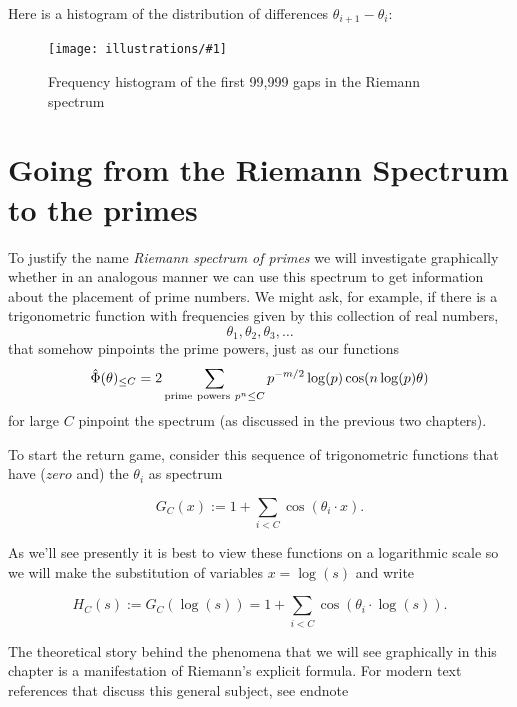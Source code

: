 \documentclass[openany]{book}
\newcommand{\ill}[3]{%
   \begin{figure}[H]%
   \vspace{-2ex}
   \centering%
   \texttt{[image: illustrations/\#1]}%
   \caption{#3}%
   \vspace{-2ex}
    \end{figure}}
\theoremstyle{plain}
\theoremstyle{definition}
\begin{document}
{{{        Here is a histogram of the distribution of differences $\theta_{i+1}-\theta_i$:
\


\ill{riemann_spectrum_gaps}{0.95}{Frequency histogram of the
first 99{,}999 gaps in the Riemann spectrum\label{fig:riemann_spectrum_gaps}}

\chapter{Going from the Riemann Spectrum to the primes}

To justify the name {\it Riemann spectrum of primes} we will
investigate graphically whether in an analogous manner we can use this
spectrum to get information about the placement of prime numbers. We
might ask, for example, if there is a trigonometric function with
frequencies given by this collection of real
numbers, $$\theta_1,\theta_2,\theta_3,\dots$$ that somehow pinpoints
the prime powers, just as our functions $${\hat \Phi}(\theta)_{\le C}=
2\sum_{{\rm prime\ powers\ } p^n \le C}
p^{-m/2}\log(p)\cos(n\log(p)\theta)$$ for large $C$ pinpoint the
spectrum (as discussed in the previous two chapters).

  To start the return game, consider this sequence of trigonometric functions that have ($zero$ and)  the $\theta_i$ as  spectrum

   $$G_C(x):= 1+ \sum_{i < C}\cos(\theta_i\cdot x).$$

    As we'll see  presently it is best to view these functions on a logarithmic scale so we will make the substitution of variables  $x = \log(s)$ and write

    $$H_C(s):= G_C(\log(s))= 1+ \sum_{i < C}\cos(\theta_i\cdot \log(s)).$$


   The theoretical story behind the phenomena that we will
     see graphically in this chapter is a manifestation of
     Riemann's explicit formula.  For modern text references that discuss this general subject, see endnote }}}
\end{document}
